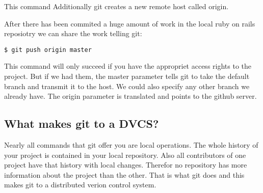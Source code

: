 This command  \cite{gitpro2009}
Additionally git creates a new remote host called origin.

After there has been commited a huge amount of work in the local ruby on rails
reposiotry we can share the work telling git:

\begin{lstlisting}
$ git push origin master 
\end{lstlisting}

This command will only succeed if you have the appropriet access rights to the
project. But if we had them, the master parameter
tells git to take the default branch and transmit it to the host. We could also
specify any other branch we already have. The origin parameter is translated and
points to the github server.









\subsection {What makes git to a DVCS?}

Nearly all commands that git offer you are local operations. 
The whole history of your project is contained in your local repository. 
Also all contributors of one project have that history with local changes. 
Therefor no repository has more information about the project than the other.
That is what git does and this makes git to a distributed verion control system.

